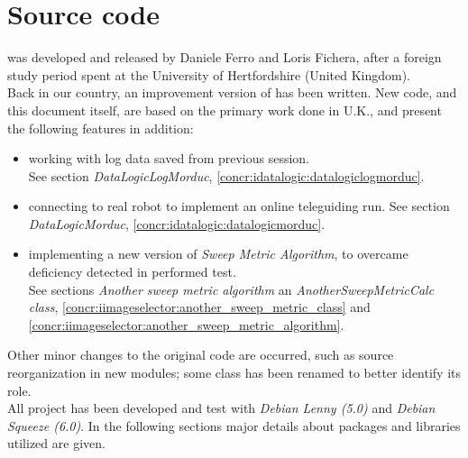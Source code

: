 \setcounter{figure}{0}
\setcounter{table}{0}
\setcounter{lstlisting}{0}

\chapter{Source code}
\label{sourcecode}
\minitoc

\framework{} was developed and released
by Daniele Ferro and Loris Fichera, after a foreign study
period spent at the University of Hertfordshire (United Kingdom).
\\
Back in our country, an improvement version of \framework{} has
been written.
New code, and this document itself, are based on the primary
work done in U.K., and present the following features in
addition:

\begin{itemize}

\item working with log data saved from previous
      \morduc{} session. \\
      See section \textit{DataLogicLogMorduc},
      \ref{concr:idatalogic:datalogiclogmorduc}.
      

\item connecting to real \morduc{} robot to implement
      an online teleguiding run.
      See section \textit{DataLogicMorduc},
      \ref{concr:idatalogic:datalogicmorduc}.

\item implementing a new version of \textit{Sweep Metric
      Algorithm}, to overcame deficiency detected in
      performed test. \\
      See sections \textit{Another sweep metric algorithm}
      an \textit{AnotherSweepMetricCalc class},
      \ref{concr:iimageselector:another_sweep_metric_class}
      and
      \ref{concr:iimageselector:another_sweep_metric_algorithm}.

\end{itemize}

Other minor changes to the original code are occurred, such
as source reorganization in new modules; some class has
been renamed to better identify its role.
\\
All project has been developed and test with \textit{Debian Lenny (5.0)}
and \textit{Debian Squeeze (6.0)}. In the following sections major
details about packages and libraries utilized are given.

\clearpage

